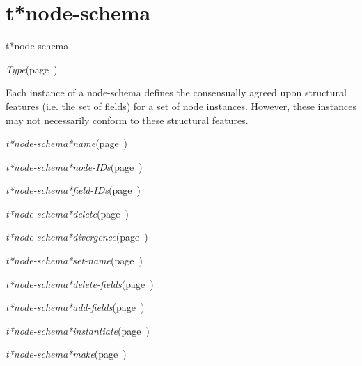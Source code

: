 \section{t*node-schema}
\label{t*node-schema}

\begin{description}
\item [Name:]  t*node-schema

\item [Layer:] {\sl Type}\hfill(page~\pageref{Type})

\item [Description:]

Each instance of a node-schema defines the consensually 
agreed upon structural features (i.e. the set of fields)
for a set of node instances.  However, these instances
may not necessarily conform to these structural 
features. 

\item [Attributes:]
\item {\sl t*node-schema*name}\hfill(page~\pageref{t*node-schema*name})
\item {\sl t*node-schema*node-IDs}\hfill(page~\pageref{t*node-schema*node-IDs})
\item {\sl t*node-schema*field-IDs}\hfill(page~\pageref{t*node-schema*field-IDs})

\item [Operations:]
\item {\sl t*node-schema*delete}\hfill(page~\pageref{t*node-schema*delete})
\item {\sl t*node-schema*divergence}\hfill(page~\pageref{t*node-schema*divergence})
\item {\sl t*node-schema*set-name}\hfill(page~\pageref{t*node-schema*set-name})
\item {\sl t*node-schema*delete-fields}\hfill(page~\pageref{t*node-schema*delete-fields})
\item {\sl t*node-schema*add-fields}\hfill(page~\pageref{t*node-schema*add-fields})
\item {\sl t*node-schema*instantiate}\hfill(page~\pageref{t*node-schema*instantiate})
\item {\sl t*node-schema*make}\hfill(page~\pageref{t*node-schema*make})

\item [Subclasses:]


\item [Superclasses:]


\item [Instances:]




\end{description}
\horizontalline

